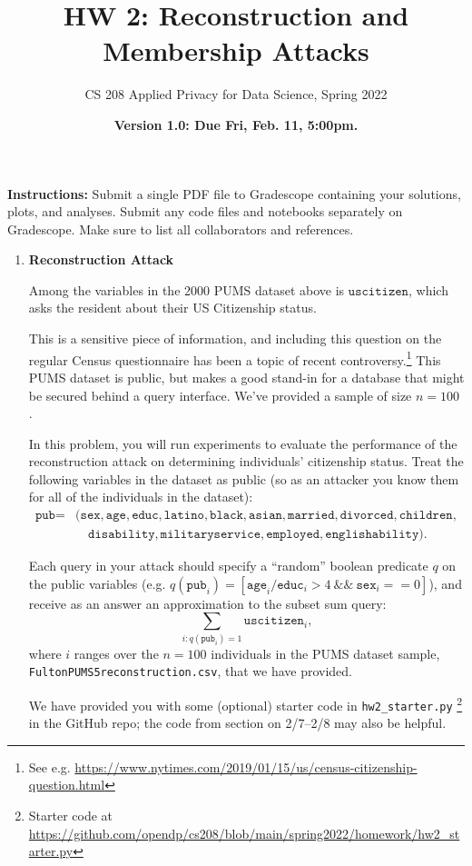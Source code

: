 \documentclass[11pt]{article}
\title{\vspace{-1.5cm} HW 2: Reconstruction and Membership Attacks}
\author{CS 208 Applied Privacy for Data Science, Spring 2022}
\date{\textbf{Version 1.0: Due Fri, Feb. 11, 5:00pm.}}
\newcommand{\instructions}{\noindent \textbf{Instructions:} Submit a single PDF file to Gradescope containing your solutions, plots, and analyses. Submit any code files and notebooks separately on Gradescope. Make sure to list all collaborators and references.}
\newcommand{\pub}{\texttt{pub}}
\newcommand{\us}{\texttt{uscitizen}}
\newcommand{\sex}{\texttt{sex}}
\newcommand{\age}{\texttt{age}}
\newcommand{\educ}{\texttt{educ}}
\newcommand{\married}{\texttt{married}}
\newcommand{\divorced}{\texttt{divorced}}
\newcommand{\latino}{\texttt{latino}}
\newcommand{\black}{\texttt{black}}
\newcommand{\asian}{\texttt{asian}}
\newcommand{\children}{\texttt{children}}
\newcommand{\employed}{\texttt{employed}}
\newcommand{\militaryservice}{\texttt{militaryservice}}
\newcommand{\disability}{\texttt{disability}}
\newcommand{\englishability}{\texttt{englishability}}
\begin{document}
	\maketitle
	
	\instructions
	
	
	\newcommand{\nval}{100}
	
	\begin{enumerate}[leftmargin=*]
		
		\item \textbf{Reconstruction Attack}  \label{prob:reconstruction}
		
		Among the variables in the 2000 PUMS dataset above is $\us$, which asks the resident about their US Citizenship status.

		This is a sensitive piece of information, and including this question on the regular Census questionnaire has been a topic of recent controversy.\footnote{See e.g. \url{https://www.nytimes.com/2019/01/15/us/census-citizenship-question.html}} This PUMS dataset is public, but makes a good stand-in for a database that might be secured behind a query interface. We've provided a sample of size $n=\nval$.\ 
		
		In this problem, you will run experiments to evaluate the performance of the reconstruction attack on determining individuals' citizenship status. Treat the following variables in the dataset as public (so as an attacker you know them for all of the individuals in the dataset): 
		\begin{align}
		\pub =& (\sex, \age, \educ, \latino, \black, \asian, \married, \divorced, \children, \nonumber \\ &\quad \disability, \militaryservice, \employed,   \englishability).\nonumber
		\end{align}

		Each query in your attack should specify a ``random'' boolean predicate $q$ on the public variables (e.g. $q(\pub_i) = [\age_i/\educ_i > 4 ~\&\&~ \sex_i == 0]$), and receive as an answer an approximation to the subset sum query:
		\begin{equation}
		\sum_{i : q(\pub_i)=1} \us_i,
		\label{eqn:sumquery}
		\end{equation}
		where $i$ ranges over the $n=\nval$ individuals in the PUMS dataset sample, \texttt{FultonPUMS5reconstruction.csv}, that we have provided.

		We have provided you with some (optional) starter code in \texttt{hw2\_starter.py}
		\footnote{Starter code at \url{https://github.com/opendp/cs208/blob/main/spring2022/homework/hw2_starter.py}} in the GitHub repo; the code
		from section on 2/7--2/8 may also be helpful.


\end{enumerate}
\end{document}
